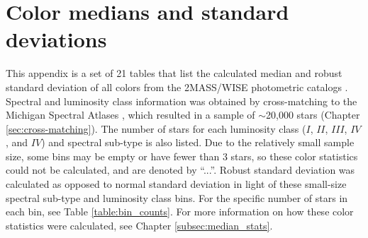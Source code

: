 \chapter{Color medians and standard deviations}\label{Appendix:2}
This appendix is a set of 21 tables that list the calculated median and robust standard deviation of all colors from the 2MASS/WISE photometric catalogs \citep{2MASS,ALLWISE}. Spectral and luminosity class information was obtained by cross-matching to the Michigan Spectral Atlases \citep{Houk1975,Houk1978,Houk1982,Houk1988,Houk1999}, which resulted in a sample of $\sim$20,000 stars (Chapter \ref{sec:cross-matching}). The number of stars for each luminosity class ($I$, $II$, $III$, $IV$, and $IV$) and spectral sub-type is also listed. Due to the relatively small sample size, some bins may be empty or have fewer than 3 stars, so these color statistics could not be calculated, and are denoted by ``...''. Robust standard deviation was calculated as opposed to normal standard deviation in light of these small-size spectral sub-type and luminosity class bins. For the specific number of stars in each bin, see Table \ref{table:bin_counts}. For more information on how these color statistics were calculated, see Chapter \ref{subsec:median_stats}.


